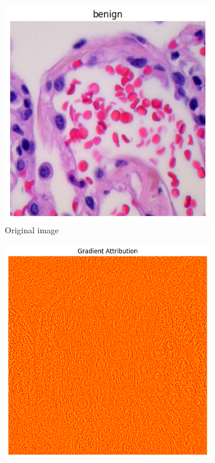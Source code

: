 \documentclass[10pt,twocolumn]{article}
\begin{document}
\begin{figure}[h]
\centering
\begin{subfigure}{0.32\columnwidth}
\includegraphics[width=\linewidth]{imgs/normal_image.png}
\caption{Original image}
\end{subfigure}
\hfill
\begin{subfigure}{0.32\columnwidth}
\includegraphics[width=\linewidth]{imgs/scatnet_bp.png}

\end{subfigure}
\end{figure}
\end{document}
